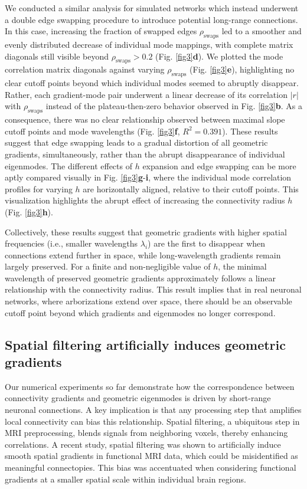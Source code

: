 \documentclass{article}
\begin{document}
We conducted a similar analysis for simulated networks which instead underwent a double edge swapping procedure to introduce potential long-range connections. In this case, increasing the fraction of swapped edges $\rho_{\text{swaps}}$ led to a smoother and evenly distributed decrease of individual mode mappings, with complete matrix diagonals still visible beyond $\rho_{\text{swaps}}>0.2$ (Fig. \ref{fig3}\textbf{d}). We plotted the mode correlation matrix diagonals against varying $\rho_{\text{swaps}}$ (Fig. \ref{fig3}\textbf{e}), highlighting no clear cutoff points beyond which individual modes seemed to abruptly disappear. Rather, each gradient-mode pair underwent a linear decrease of its correlation $|r|$ with $\rho_{\text{swaps}}$ instead of the plateau-then-zero behavior observed in Fig. \ref{fig3}\textbf{b}. As a consequence, there was no clear relationship observed between maximal slope cutoff points and mode wavelengths (Fig. \ref{fig3}\textbf{f}, $R^2=0.391$). These results suggest that edge swapping leads to a gradual distortion of all geometric gradients, simultaneously, rather than the abrupt disappearance of individual eigenmodes. The different effects of $h$ expansion and edge swapping can be more aptly compared visually in Fig. \ref{fig3}\textbf{g}-\textbf{i}, where the individual mode correlation profiles for varying $h$ are horizontally aligned, relative to their cutoff points. This visualization highlights the abrupt effect of increasing the connectivity radius $h$ (Fig. \ref{fig3}\textbf{h}).

Collectively, these results suggest that geometric gradients with higher spatial frequencies (i.e., smaller wavelengths $\lambda_i$) are the first to disappear when connections extend further in space, while long-wavelength gradients remain largely preserved. For a finite and non-negligible value of $h$, the minimal wavelength of preserved geometric gradients approximately follows a linear relationship with the connectivity radius. This result implies that in real neuronal networks, where arborizations extend over space, there should be an observable cutoff point beyond which gradients and eigenmodes no longer correspond.

\subsection*{Spatial filtering artificially induces geometric gradients}

Our numerical experiments so far demonstrate how the correspondence between connectivity gradients and geometric eigenmodes is driven by short-range neuronal connections. A key implication is that any processing step that amplifies local connectivity can bias this relationship. Spatial filtering, a ubiquitous step in MRI preprocessing, blends signals from neighboring voxels, thereby enhancing correlations. A recent study\cite{watson2023connectopic}, spatial filtering was shown to artificially induce smooth spatial gradients in functional MRI data, which could be misidentified as meaningful connectopies\cite{conne}. This bias was accentuated when considering functional gradients at a smaller spatial scale within individual brain regions. 
\end{document}
